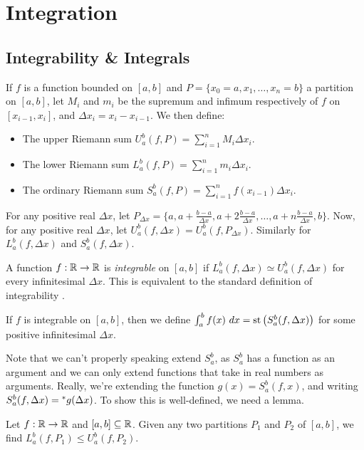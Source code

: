 \section{Integration}\label{sec:Integration}


\subsection{Integrability \& Integrals}
If $f$ is a function bounded on $[a, b]$ and $P = \{x_0 = a, x_1, \ldots, x_n = b\}$ a partition on $[a, b]$, let $M_i$ and $m_i$ be the supremum and infimum respectively of $f$ on $[x_{i-1}, x_i]$, and $\Delta x_i = x_i - x_{i-1}$. We then define:
\begin{itemize}
    \item The upper Riemann sum $U_a^b(f, P) = \sum_{i=1}^n M_i\Delta x_i$.
    \item The lower Riemann sum $L_a^b(f, P) =\sum_{i=1}^n m_i\Delta x_i$.
    \item The ordinary Riemann sum $S_a^b(f, P) = \sum_{i=1}^n f(x_{i-1})\Delta x_i$.
\end{itemize}
For any positive real $\Delta x$, let $P_{\Delta x} = \{a, a+\frac{b-a}{\Delta x}, a + 2\frac{b-a}{\Delta x}, \ldots, a + n\frac{b-a}{\Delta x}, b\}$. Now, for any positive real $\Delta x$, let $U_a^b(f, \Delta x) = U_a^b(f, P_{\Delta x})$. Similarly for $L_a^b(f, \Delta x)$ and $S_a^b(f, \Delta x)$.

A function $f: \mathbb{R} \to \mathbb{R}$ is \textit{integrable} on $[a, b]$ if $L_a^b(f, \Delta x) \simeq U_a^b(f, \Delta x)$ for every infinitesimal $\Delta x$. This is equivalent to the standard definition of integrability \cite[110]{goldblatt1998}.

\begin{defn}
If $f$ is integrable on $[a, b]$, then we define $\int_a^b f(x)\ dx = \operatorname{st}\left(S_a^b(f, \Delta x)\right)$ for some positive infinitesimal $\Delta x$. 
\end{defn}
Note that we can't properly speaking extend $S_a^b$, as $S_a^b$ has a function as an argument and we can only extend functions that take in real numbers as arguments. Really, we're extending the function $g(x) = S_a^b (f, x)$, and writing $S_a^b (f, \Delta x) = \prescript{*}{}{g}(\Delta x)$. To show this is well-defined, we need a lemma.

\begin{lemma}
    Let $f: \mathbb{R} \to \mathbb{R}$ and $[a, b] \subseteq \mathbb{R}$. Given any two partitions $P_1$ and $P_2$ of $[a, b]$, we find $L_a^b(f, P_1) \leq U_a^b(f, P_2)$.
\end{lemma}

